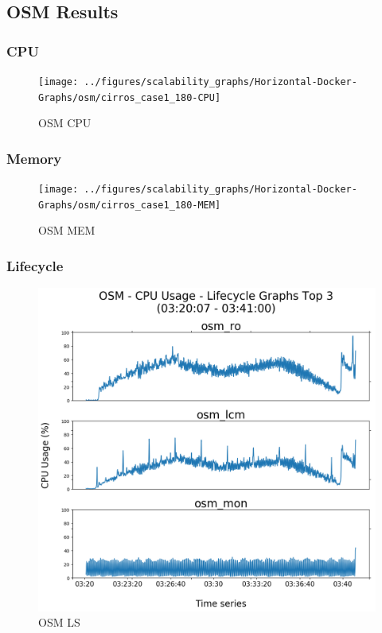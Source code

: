 \subsection{OSM Results}

\subsubsection{CPU}

\begin{figure}[h]
	\centering
	\texttt{[image: ../figures/scalability\_graphs/Horizontal-Docker-Graphs/osm/cirros\_case1\_180-CPU]}
	\caption{OSM CPU}
	\label{fig:cirroscase1180-cpu}
\end{figure}

\subsubsection{Memory}

\begin{figure}[h]
	\centering
	\texttt{[image: ../figures/scalability\_graphs/Horizontal-Docker-Graphs/osm/cirros\_case1\_180-MEM]}
	\caption{OSM MEM}
	\label{fig:cirroscase1180-mem}
\end{figure}

\subsubsection{Lifecycle}

\begin{figure}[h]
	\centering
	\includegraphics[width=0.7\linewidth]{figures/scalability_graphs/Lifecycle-Graphs-Top-3/OSM-TOP-3-Lifecycle}
	\caption{OSM LS}
	\label{fig:osm-top-3-lifecycle}
\end{figure}
